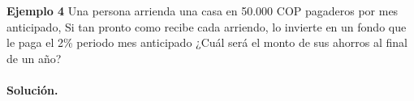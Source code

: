 \textbf{Ejemplo 4}\newline
Una persona arrienda una casa en 50.000 COP pagaderos por mes anticipado, Si tan pronto como recibe cada arriendo, lo invierte en un fondo que le paga el 2\% periodo mes anticipado ¿Cuál será el monto de sus ahorros al final de un año?\\ \\

\textbf{Solución.}\\
